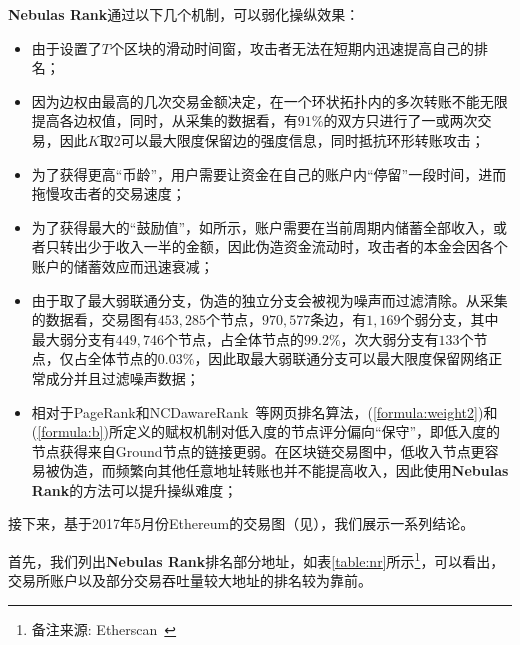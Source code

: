 \textbf{Nebulas Rank}通过以下几个机制，可以弱化操纵效果：
\begin{itemize}
	\item 由于设置了$T$个区块的滑动时间窗，攻击者无法在短期内迅速提高自己的排名；
	\item 因为边权由最高的几次交易金额决定，在一个环状拓扑内的多次转账不能无限提高各边权值，同时，从采集的数据看，有$91\%$的双方只进行了一或两次交易，因此$K$取$2$可以最大限度保留边的强度信息，同时抵抗环形转账攻击；
	\item 为了获得更高“币龄”，用户需要让资金在自己的账户内“停留”一段时间，进而拖慢攻击者的交易速度；
	\item 为了获得最大的“鼓励值”，如所示，账户需要在当前周期内储蓄全部收入，或者只转出少于收入一半的金额，因此伪造资金流动时，攻击者的本金会因各个账户的储蓄效应而迅速衰减；
	\item 由于取了最大弱联通分支，伪造的独立分支会被视为噪声而过滤清除。从采集的数据看，交易图有$453,285$个节点，$970,577$条边，有$1,169$个弱分支，其中最大弱分支有$449,746$个节点，占全体节点的$99.2\%$，次大弱分支有$133$个节点，仅占全体节点的$0.03\%$，因此取最大弱联通分支可以最大限度保留网络正常成分并且过滤噪声数据；
	\item 相对于PageRank和NCDawareRank~\cite{Nikolakopoulos2013}等网页排名算法，(\ref{formula:weight2})和(\ref{formula:b})所定义的赋权机制对低入度的节点评分偏向“保守”，即低入度的节点获得来自Ground节点的链接更弱。在区块链交易图中，低收入节点更容易被伪造，而频繁向其他任意地址转账也并不能提高收入，因此使用\textbf{Nebulas Rank}的方法可以提升操纵难度；
\end{itemize}

接下来，基于2017年5月份Ethereum的交易图（见），我们展示一系列结论。

首先，我们列出\textbf{Nebulas Rank}排名部分地址，如表\ref{table:nr}所示\footnote{备注来源: Etherscan~\cite{etherscan}}，可以看出，交易所账户以及部分交易吞吐量较大地址的排名较为靠前。

\newpage

